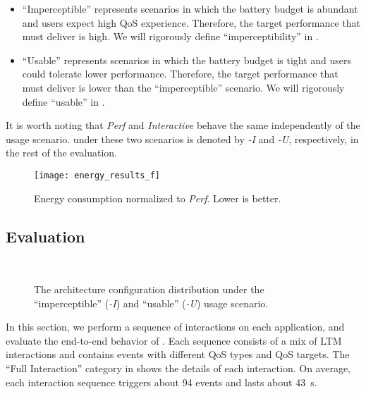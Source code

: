 \begin{itemize}
  \item ``Imperceptible'' represents scenarios in which the battery budget is abundant and users expect high QoS experience. Therefore, the target performance that \webrt must deliver is high. We will rigorously define ``imperceptibility'' in .
  
  \item ``Usable'' represents scenarios in which the battery budget is tight and users could tolerate lower performance. Therefore, the target performance that \webrt must deliver is lower than the ``imperceptible'' scenario. We will rigorously define ``usable'' in .
\end{itemize}

It is worth noting that \textit{Perf} and \textit{Interactive} behave the same independently of the usage scenario. \ebs under these two scenarios is denoted by \textit{\ebs-I} and \textit{\ebs-U}, respectively, in the rest of the evaluation.



\begin{figure}[t]
\centering
\texttt{[image: energy\_results\_f]}
\caption{Energy consumption normalized to \textit{Perf}. Lower is better.}
\label{fig:energy_results_f}
\end{figure}

\subsection{Evaluation}
\label{sec:runtime:ebs:eval}

\begin{figure}[p]
\centering
{}\\
\vspace*{25pt}
\caption{The architecture configuration distribution under the ``imperceptible'' (\textit{\ebs-I}) and ``usable''  (\textit{\ebs-U}) usage scenario.}
\label{fig:freq_dist}
\end{figure}

In this section, we perform a sequence of interactions on each application, and evaluate the end-to-end behavior of \ebs. Each sequence consists of a mix of LTM interactions and contains events with different QoS types and QoS targets. The ``Full Interaction'' category in  shows the details of each interaction. On average, each interaction sequence triggers about 94 events and lasts about 43~s.


